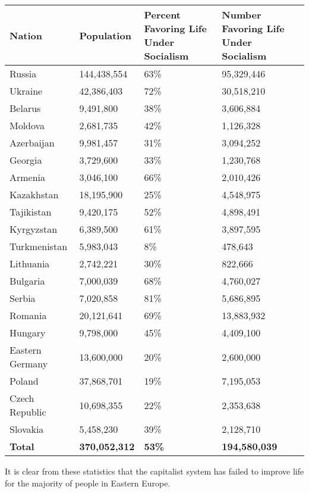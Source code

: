 \begin{center}
\begin{tabular}{|l|l|p{3cm}|p{3cm}|}
\hline
\textbf{Nation} & \textbf{Population} & \textbf{Percent Favoring Life Under Socialism} & \textbf{Number Favoring Life Under Socialism} \\\hline
Russia & 144,438,554 & 63\% & 95,329,446 \\\hline
Ukraine & 42,386,403 & 72\% & 30,518,210 \\\hline
Belarus & 9,491,800 & 38\% & 3,606,884 \\\hline
Moldova & 2,681,735 & 42\% & 1,126,328 \\\hline
Azerbaijan & 9,981,457 & 31\% & 3,094,252 \\\hline
Georgia & 3,729,600 & 33\% & 1,230,768 \\\hline
Armenia & 3,046,100 & 66\% & 2,010,426 \\\hline
Kazakhstan & 18,195,900 & 25\% & 4,548,975 \\\hline
Tajikistan & 9,420,175 & 52\% & 4,898,491 \\\hline
Kyrgyzstan & 6,389,500 & 61\% & 3,897,595 \\\hline
Turkmenistan & 5,983,043 & 8\% & 478,643 \\\hline
Lithuania & 2,742,221 & 30\% & 822,666 \\\hline
Bulgaria & 7,000,039 & 68\% & 4,760,027 \\\hline
Serbia & 7,020,858 & 81\% & 5,686,895 \\\hline
Romania & 20,121,641 & 69\% & 13,883,932 \\\hline
Hungary & 9,798,000 & 45\% & 4,409,100 \\\hline
Eastern Germany & 13,600,000 & 20\% & 2,600,000 \\\hline
Poland & 37,868,701 & 19\% & 7,195,053 \\\hline
Czech Republic & 10,698,355 & 22\% & 2,353,638 \\\hline
Slovakia & 5,458,230 & 39\% & 2,128,710 \\\hline
\textbf{Total} & \textbf{370,052,312} & \textbf{53\%} & \textbf{194,580,039} \\\hline
\end{tabular}
\end{center}

It is clear from these statistics that the capitalist system has failed to improve life for the majority of people in Eastern Europe.

